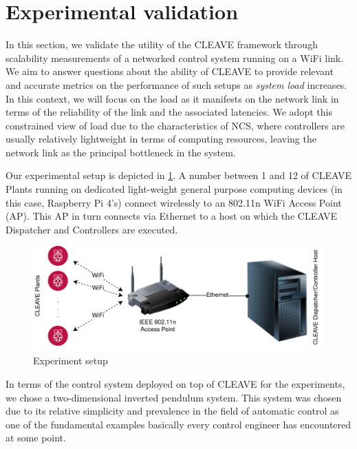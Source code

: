\section{Experimental validation}\label{sec:experiments}


In this section, we validate the utility of the CLEAVE framework through scalability measurements of a networked control system running on a WiFi link.
We aim to answer questions about the ability of CLEAVE to provide relevant and accurate metrics on the performance of such setups as \emph{system load} increases.
In this context, we will focus on the load as it manifests on the network link in terms of the reliability of the link and the associated latencies. 
We adopt this constrained view of load due to the characteristics of NCS, where controllers are usually relatively lightweight in terms of computing resources, leaving the network link as the principal bottleneck in the system.

Our experimental setup is depicted in \cref{fig:cleave:expsetup}.
A number between 1 and 12 of CLEAVE Plants running on dedicated light-weight general purpose computing devices (in this case, Raspberry Pi 4's) connect wirelessly to an 802.11n WiFi Access Point (AP).
This AP in turn connects via Ethernet to a host on which the CLEAVE Dispatcher and Controllers are executed.

\begin{figure}
    \centering
    \includegraphics[width=.95\columnwidth]{images/CLEAVE_experiment_setup}
    \caption{Experiment setup}\label{fig:cleave:expsetup}
\end{figure}

In terms of the control system deployed on top of CLEAVE for the experiments, we chose a two-dimensional inverted pendulum system.
This system was chosen due to its relative simplicity and prevalence in the field of automatic control as one of the fundamental examples basically every control engineer has encountered at some point.

